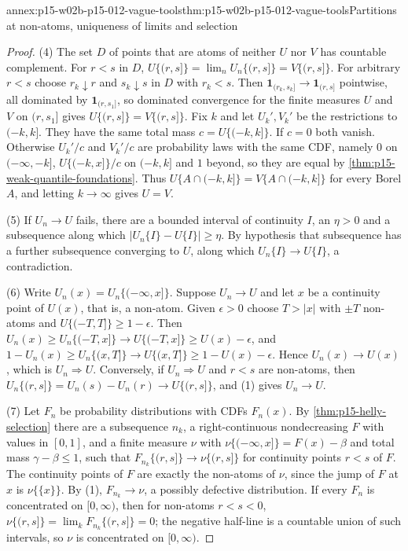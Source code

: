 \begin{annexitem}{annex:p15-w02b-p15-012-vague-tools}{thm:p15-w02b-p15-012-vague-tools}{Partitions at non-atoms, uniqueness of limits and selection}
\begin{proof}
(4) The set \(D\) of points that are atoms of neither \(U\) nor \(V\) has
countable complement. For \(r<s\) in \(D\),
\(U\{(r,s]\}=\lim_nU_n\{(r,s]\}=V\{(r,s]\}\). For arbitrary \(r<s\) choose
\(r_k\downarrow r\) and \(s_k\downarrow s\) in \(D\) with \(r_k<s\). Then
\(\mathbf 1_{(r_k,s_k]}\to\mathbf 1_{(r,s]}\) pointwise, all dominated by
\(\mathbf 1_{(r,s_1]}\), so dominated convergence for the finite measures
\(U\) and \(V\) on \((r,s_1]\) gives \(U\{(r,s]\}=V\{(r,s]\}\). Fix \(k\) and
let \(U_k',V_k'\) be the restrictions to \((-k,k]\). They have the same total
mass \(c=U\{(-k,k]\}\). If \(c=0\) both vanish. Otherwise
\(U_k'/c\) and \(V_k'/c\) are probability laws with the same CDF, namely
\(0\) on \((-\infty,-k]\), \(U\{(-k,x]\}/c\) on \((-k,k]\) and \(1\) beyond, so
they are equal by \cref{thm:p15-weak-quantile-foundations}. Thus
\(U\{A\cap(-k,k]\}=V\{A\cap(-k,k]\}\) for every Borel \(A\), and letting
\(k\to\infty\) gives \(U=V\).

(5) If \(U_n\to U\) fails, there are a bounded interval of continuity \(I\),
an \(\eta>0\) and a subsequence along which \(|U_n\{I\}-U\{I\}|\geq\eta\). By
hypothesis that subsequence has a further subsequence converging to \(U\),
along which \(U_n\{I\}\to U\{I\}\), a contradiction.

(6) Write \(U_n(x)=U_n\{(-\infty,x]\}\). Suppose \(U_n\to U\) and let \(x\) be
a continuity point of \(U(x)\), that is, a non-atom. Given \(\epsilon>0\)
choose \(T>|x|\) with \(\pm T\) non-atoms and \(U\{(-T,T]\}\geq1-\epsilon\).
Then \(U_n(x)\geq U_n\{(-T,x]\}\to U\{(-T,x]\}\geq U(x)-\epsilon\), and
\(1-U_n(x)\geq U_n\{(x,T]\}\to U\{(x,T]\}\geq1-U(x)-\epsilon\). Hence
\(U_n(x)\to U(x)\), which is \(U_n\Rightarrow U\). Conversely, if
\(U_n\Rightarrow U\) and \(r<s\) are non-atoms, then
\(U_n\{(r,s]\}=U_n(s)-U_n(r)\to U\{(r,s]\}\), and (1) gives \(U_n\to U\).

(7) Let \(F_n\) be probability distributions with CDFs \(F_n(x)\). By
\cref{thm:p15-helly-selection} there are a subsequence \(n_k\), a
right-continuous nondecreasing \(F\) with values in \([0,1]\), and a finite
measure \(\nu\) with \(\nu\{(-\infty,x]\}=F(x)-\beta\) and total mass
\(\gamma-\beta\leq1\), such that \(F_{n_k}\{(r,s]\}\to\nu\{(r,s]\}\) for
continuity points \(r<s\) of \(F\). The continuity points of \(F\) are exactly
the non-atoms of \(\nu\), since the jump of \(F\) at \(x\) is \(\nu\{\{x\}\}\).
By (1), \(F_{n_k}\to\nu\), a possibly defective distribution. If every \(F_n\)
is concentrated on \([0,\infty)\), then for non-atoms \(r<s<0\),
\(\nu\{(r,s]\}=\lim_kF_{n_k}\{(r,s]\}=0\); the negative half-line is a
countable union of such intervals, so \(\nu\) is concentrated on
\([0,\infty)\).
\end{proof}
\end{annexitem}

